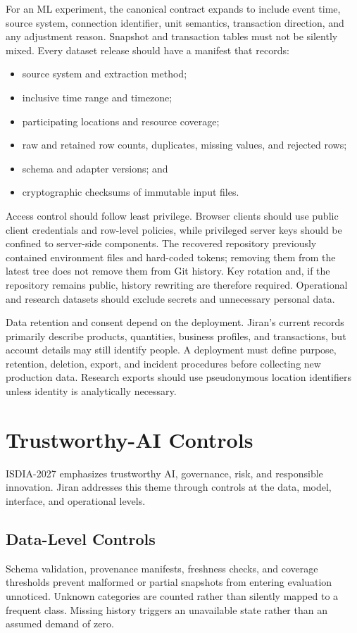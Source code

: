 \documentclass[graybox]{svmult}
\begin{document}
For an ML experiment, the canonical contract expands to include event time, source system, connection identifier, unit semantics, transaction direction, and any adjustment reason. Snapshot and transaction tables must not be silently mixed. Every dataset release should have a manifest that records:
\begin{itemize}
\item source system and extraction method;
\item inclusive time range and timezone;
\item participating locations and resource coverage;
\item raw and retained row counts, duplicates, missing values, and rejected rows;
\item schema and adapter versions; and
\item cryptographic checksums of immutable input files.
\end{itemize}

Access control should follow least privilege. Browser clients should use public client credentials and row-level policies, while privileged server keys should be confined to server-side components. The recovered repository previously contained environment files and hard-coded tokens; removing them from the latest tree does not remove them from Git history. Key rotation and, if the repository remains public, history rewriting are therefore required. Operational and research datasets should exclude secrets and unnecessary personal data.

Data retention and consent depend on the deployment. Jiran's current records primarily describe products, quantities, business profiles, and transactions, but account details may still identify people. A deployment must define purpose, retention, deletion, export, and incident procedures before collecting new production data. Research exports should use pseudonymous location identifiers unless identity is analytically necessary.

\section{Trustworthy-AI Controls}
ISDIA-2027 emphasizes trustworthy AI, governance, risk, and responsible innovation. Jiran addresses this theme through controls at the data, model, interface, and operational levels.

\subsection{Data-Level Controls}
Schema validation, provenance manifests, freshness checks, and coverage thresholds prevent malformed or partial snapshots from entering evaluation unnoticed. Unknown categories are counted rather than silently mapped to a frequent class. Missing history triggers an unavailable state rather than an assumed demand of zero.
\end{document}
